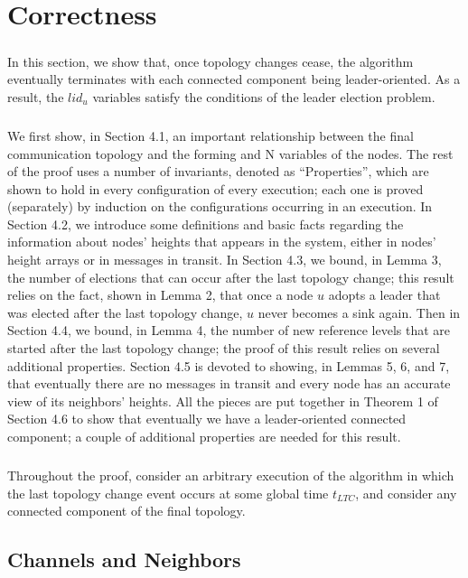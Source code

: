 \chapter{Correctness}
\paragraph{}In this section, we show that, once topology changes cease, the algorithm eventually terminates with each connected component being leader-oriented. As a result, the $lid_u$ variables satisfy the conditions of the leader election problem.
\paragraph{}We first show, in Section 4.1, an important relationship between the final communication topology and the forming and N variables of the nodes. The rest of the proof uses a number of invariants, denoted as “Properties”, which are shown to hold in every configuration of every execution; each one is proved (separately) by induction on the configurations occurring in an execution. In Section 4.2, we introduce some definitions and basic facts regarding the information about nodes' heights that appears in the system, either in nodes' height arrays or in messages in transit. In Section 4.3, we bound, in Lemma 3, the number of elections that can occur after the last topology change; this result relies on the fact, shown in Lemma 2, that once a node $u$ adopts a leader that was elected after the last topology change, $u$ never becomes a sink again. Then in Section 4.4, we bound, in Lemma 4, the number of new reference levels that are started after the last topology change; the proof of this result relies on several additional properties. Section 4.5 is devoted to showing, in Lemmas 5, 6, and 7, that eventually there are no messages in transit and every node has an accurate view of its neighbors' heights. All the pieces are put together in Theorem 1 of Section 4.6 to show that eventually we have a leader-oriented connected component; a couple of additional properties are needed for this result.
\paragraph{}Throughout the proof, consider an arbitrary execution of the algorithm in which the last topology change event occurs at some global time $t_{LTC}$, and consider any connected component of the final topology.
\section{Channels and Neighbors}
